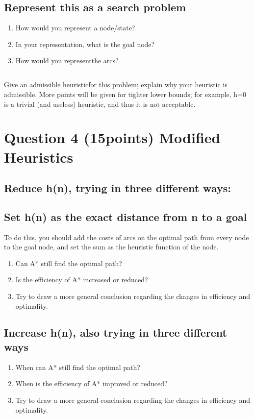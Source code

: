 \documentclass{article}
\begin{document}
\subsection{Represent this as a search problem}
\begin{enumerate}[label=(\alph*)]
    \item How would you represent a node/state?
    \item In your representation, what is the goal node?
    \item How would you representthe arcs?
\end{enumerate}

\subsection{}
Give  an  admissible  heuristicfor  this  problem;  explain  why  your  heuristic  is  admissible. More points will be given for tighter lower bounds; for example, h=0 is a trivial (and useless) heuristic, and thus it is not acceptable.


\clearpage
\section{Question 4 (15points) Modified Heuristics}

\subsection{Reduce h(n), trying in three different ways:}

\subsection{Set h(n) as the exact distance from n to a goal}
To do this, you should add the costs of arcs on the optimal path from every node to the goal node, and set the sum as the heuristic function of the node. 
\begin{enumerate}[label=(\alph*)]
    \item Can A* still find the optimal path? 
    \item Is the efficiency of A* increased or reduced? 
    \item Try to draw a more general conclusion regarding the changes in efficiency and optimality. 
\end{enumerate}

\subsection{Increase h(n), also trying in three different ways}
\begin{enumerate}[label=(\alph*)]
    \item When can A* still find the optimal path?
    \item When is the efficiency of A* improved or reduced? 
    \item Try to draw a more general conclusion regarding the changes in efficiency and optimality.
\end{enumerate}
\end{document}
